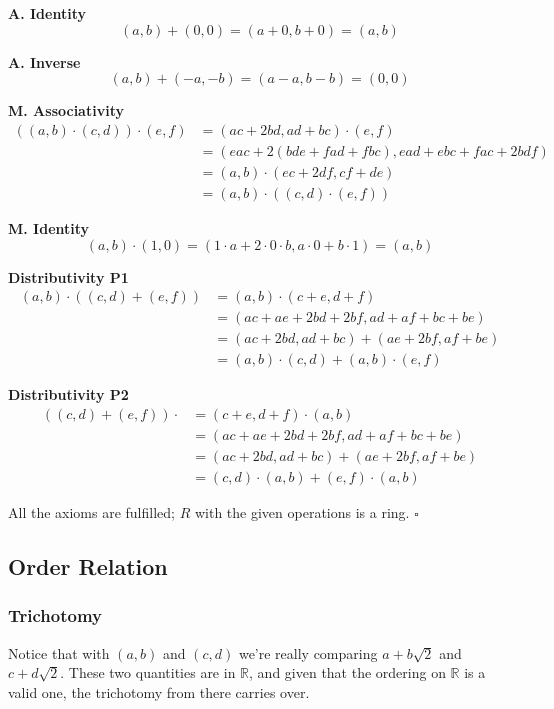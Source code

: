 \documentclass[12pt]{article}
\begin{document}
\textbf{A. Identity}
\[(a,b)+(0,0)=(a+0,b+0)=(a,b)\]

\textbf{A. Inverse}
\[(a,b)+(-a,-b)=(a-a,b-b)=(0,0)\]

\textbf{M. Associativity}
\begin{align*}
      ((a,b)\cdot(c,d))\cdot(e,f)
       & = (ac+2bd,ad+bc)\cdot(e,f)               \\
       & = (eac+2(bde+fad+fbc), ead+ebc+fac+2bdf) \\
       & = (a,b)\cdot(ec+2df,cf+de)               \\
       & = (a,b)\cdot((c,d)\cdot(e,f))
\end{align*}

\textbf{M. Identity}
\[(a,b)\cdot(1,0)=(1 \cdot a + 2 \cdot 0 \cdot b, a \cdot 0 + b \cdot 1)=(a,b)\]

\textbf{Distributivity P1}
\begin{align*}
      (a,b) \cdot ((c,d)+(e,f))
       & = (a,b) \cdot (c+e,d+f)                 \\
       & = (ac+ae+2bd+2bf,ad+af+bc+be)           \\
       & = (ac+2bd, ad+bc)+(ae+2bf, af+be)       \\
       & = (a,b) \cdot (c,d) + (a,b) \cdot (e,f)
\end{align*}

\textbf{Distributivity P2}
\begin{align*}
      ((c,d)+(e,f))\cdot
       & = (c+e,d+f)\cdot(a,b)               \\
       & = (ac+ae+2bd+2bf,ad+af+bc+be)       \\
       & = (ac+2bd, ad+bc)+(ae+2bf, af+be)   \\
       & = (c,d)\cdot(a,b) + (e,f)\cdot(a,b)
\end{align*}

All the axioms are fulfilled; $R$ with the given operations is a ring. $\square$

\pagebreak

\subsection{Order Relation}

\subsubsection{Trichotomy}

Notice that with $(a,b)$ and $(c,d)$ we're really comparing
$a+b\sqrt{2}$ and $c+d\sqrt{2}$.
These two quantities are in $\mathbb{R}$, and given that the ordering on $\mathbb{R}$
is a valid one, the trichotomy from there carries over.
\end{document}
